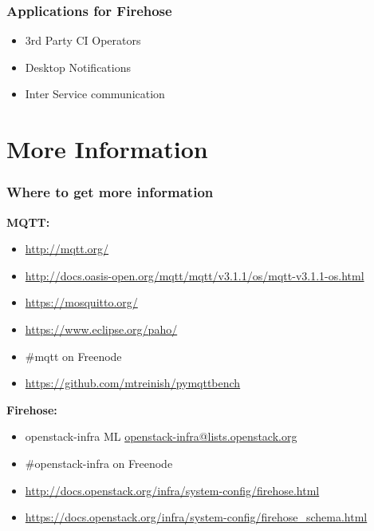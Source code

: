 \documentclass[aspectratio=169,11pt,hyperref={colorlinks=true}]{beamer}
\begin{document}
\begin{frame}
    \frametitle{Applications for Firehose}
    \begin{itemize}
        \item 3rd Party CI Operators
        \item Desktop Notifications
        \item Inter Service communication
    \end{itemize}
\end{frame}

\section{More Information}
\begin{frame}
\frametitle{Where to get more information}
    \textbf{MQTT:}
    \begin{itemize}
	    \item \href{http://mqtt.org/}{http://mqtt.org/}
        \item \href{http://docs.oasis-open.org/mqtt/mqtt/v3.1.1/os/mqtt-v3.1.1-os.html}{http://docs.oasis-open.org/mqtt/mqtt/v3.1.1/os/mqtt-v3.1.1-os.html}
	    \item \href{https://mosquitto.org/}{https://mosquitto.org/}
        \item \href{https://www.eclipse.org/paho/}{https://www.eclipse.org/paho/}
        \item \#mqtt on Freenode
        \item \href{https://github.com/mtreinish/pymqttbench}{https://github.com/mtreinish/pymqttbench}
    \end{itemize}
    \textbf{Firehose:}
    \begin{itemize}
        \item openstack-infra ML\: \href{mailto:openstack-infra@lists.openstack.org}{openstack-infra@lists.openstack.org}
        \item \#openstack-infra on Freenode
	    \item \href{http://docs.openstack.org/infra/system-config/firehose.html}{http://docs.openstack.org/infra/system-config/firehose.html}
        \item \href{https://docs.openstack.org/infra/system-config/firehose_schema.html}{https://docs.openstack.org/infra/system-config/firehose\_schema.html}
    \end{itemize}
\end{frame}
\end{document}

